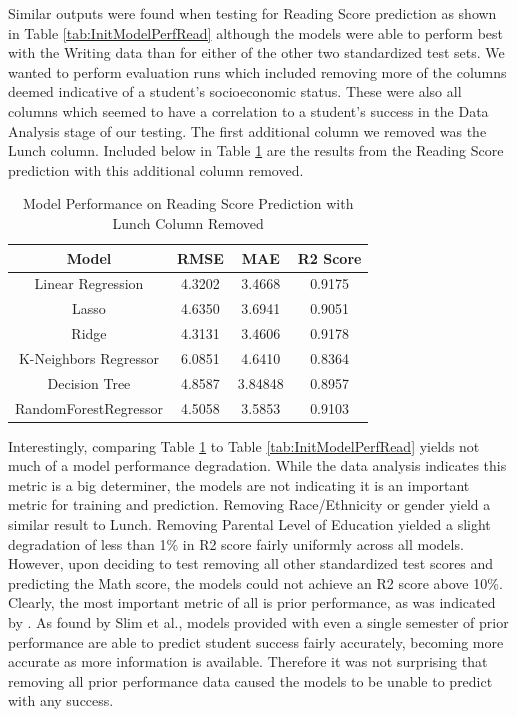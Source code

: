 \documentclass[man,floatsintext]{apa6} %
\begin{document}
Similar outputs were found when testing for Reading Score prediction as shown in Table \ref{tab:InitModelPerfRead} although the models were able to perform best with the Writing data than for either of the other two standardized test sets.
We wanted to perform evaluation runs which included removing more of the columns deemed indicative of a student's socioeconomic status. These were also all columns which seemed to have a correlation to a student's success in the Data Analysis stage of our testing.
The first additional column we removed was the Lunch column. Included below in Table \ref{tab:ReadNoLunch} are the results from the Reading Score prediction with this additional column removed.
\begin{table}[H]
    \centering
    \caption{Model Performance on Reading Score Prediction with Lunch Column Removed}
    \begin{tabular}{|c|c|c|c|}
    \hline
         Model & RMSE & MAE & R2 Score\\
         \hline\hline
         Linear Regression & 4.3202 & 3.4668 & 0.9175 \\
         \hline
         Lasso & 4.6350 & 3.6941 & 0.9051 \\
         \hline
         Ridge & 4.3131 & 3.4606 & 0.9178 \\
         \hline
         K-Neighbors Regressor & 6.0851 & 4.6410 & 0.8364 \\
         \hline
         Decision Tree & 4.8587 & 3.84848 & 0.8957 \\
         \hline
         RandomForestRegressor & 4.5058 & 3.5853 & 0.9103 \\
         \hline
    \end{tabular}
    \label{tab:ReadNoLunch}
\end{table}
Interestingly, comparing Table \ref{tab:ReadNoLunch} to Table \ref{tab:InitModelPerfRead} yields not much of a model performance degradation. While the data analysis indicates this metric is a big determiner, the models are not indicating it is an important metric for training and prediction.
Removing Race/Ethnicity or gender yield a similar result to Lunch. Removing Parental Level of Education yielded a slight degradation of less than 1\% in R2 score fairly uniformly across all models.  However, upon deciding to test removing all other standardized test scores and predicting the Math score, the models could not achieve an R2 score above 10\%.  Clearly, the most important metric of all is prior performance, as was indicated by \cite{7008697}. As found by Slim et al., models provided with even a single semester of prior performance are able to predict student success fairly accurately, becoming more accurate as more information is available. Therefore it was not surprising that removing all prior performance data caused the models to be unable to predict with any success.
\end{document}
